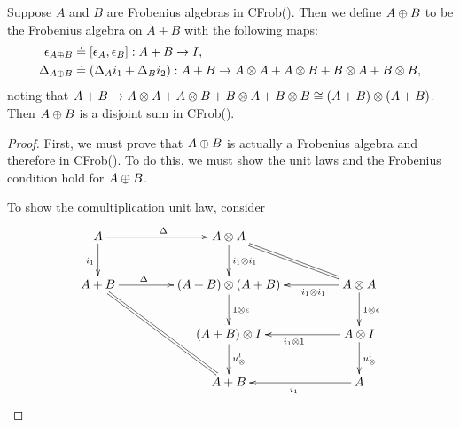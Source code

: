 \begin{proposition}\label{prop:cfrobx_has_disjoint_sums}
  Suppose $A$ and $B$ are Frobenius algebras in CFrob(\X). Then we define $A\oplus B$ to be the Frobenius
  algebra on $A+B$ with the following maps:
  \begin{align*}
    \epsilon_{A\oplus B} &\doteq [\epsilon_A,\epsilon_B]:A+B \to I,\\
    \Delta_{A\oplus B} & \doteq (\Delta_A i_1 + \Delta_B i_2):A+B\to A\otimes A+A\otimes B+B\otimes A+B\otimes B,
  \end{align*}
  noting that $A+B\to A\otimes A+A\otimes B+B\otimes A+B\otimes B \cong (A+B)\otimes(A+B)$.
  Then $A\oplus B$ is a disjoint sum in CFrob(\X).
\end{proposition}
\begin{proof}
  First, we must prove that $A\oplus B$ is actually a Frobenius algebra and therefore in CFrob(\X).
  To do this, we must show the unit laws and the Frobenius condition hold for $A\oplus B$.

  To show the comultiplication unit law, consider
  \[
     \xymatrix@C+20pt{
       A \ar[r]^{\Delta} \ar[d]_{i_1} & A\*A \ar[d]^{i_1\*i_1} \ar@{=}[dr] \\
       A+B \ar[r]^(.35){\Delta} \ar@{=}[ddr] &(A+B)\*(A+B) \ar[d]^{1\*\epsilon}
          & A\*A \ar[l]^(.35){i_1\*i_1}  \ar[d]^{1\*\epsilon}\\
       & (A+B)\*I \ar[d]^{\usl} & A\*I \ar[d]^{\usl} \ar[l]^{i_1\*1}\\
       & A+B & A \ar[l]^{i_1}
     }
  \]

\end{proof}
